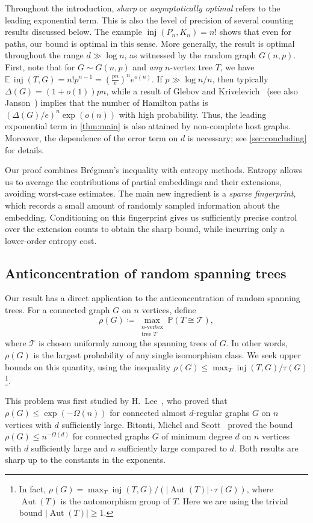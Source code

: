\documentclass[10pt,a4paper]{amsart}
\numberwithin{equation}{section}
\theoremstyle{definition}
\theoremstyle{remark}
\DeclareMathOperator{\Aut}{Aut}
\DeclareMathOperator{\inj}{inj}
\renewcommand{\Pr}{\mathbb P}
\begin{document}
Throughout the introduction, \emph{sharp} or \emph{asymptotically optimal} refers to the leading exponential term. This is also the level of precision of several counting results discussed below. The example $\inj(P_n,K_n)=n!$ shows that even for paths, our bound is optimal in this sense. More generally, the result is optimal throughout the range $d\gg \log n$, as witnessed by the random graph $G(n,p)$. First, note that for $G\sim G(n,p)$ and \textit{any} $n$-vertex tree $T$, we have $\mathbb E\,\inj(T,G)=n!p^{n-1} =\left(\frac{pn}{e}\right)^n e^{o(n)}.$
If $p\gg \log n/n$, then typically $\Delta(G)=(1+o(1))pn$, while a result of Glebov and Krivelevich~\cite{glebov2013hamilton} (see also Janson~\cite{janson1994numbers}) implies that the number of Hamilton paths is $(\Delta(G)/e)^n\exp(o(n))$ with high probability.
Thus, the leading exponential term in \cref{thm:main} is also attained by non-complete host graphs.
Moreover, the dependence of the error term on $d$ is necessary; see \cref{sec:concluding} for details.

Our proof combines Brégman's inequality with entropy methods. Entropy allows us to average the contributions of partial embeddings and their extensions, avoiding worst-case estimates. The main new ingredient is a \emph{sparse fingerprint}, which records a small amount of randomly sampled information about the embedding. Conditioning on this fingerprint gives us sufficiently precise control over the extension counts to obtain the sharp bound, while incurring only a lower-order entropy cost. 

\subsection{Anticoncentration of random spanning trees}
Our result has a direct application to the anticoncentration of random spanning trees.
For a connected graph $G$ on $n$ vertices, define
\[
    \rho(G) \coloneqq \max_{\substack{n\text{-vertex}\\ \text{tree } T}} \Pr(T\cong \mathcal T),
\]
where $\mathcal T$ is chosen uniformly among the spanning trees of $G$. In other words, $\rho(G)$ is the largest probability of any single isomorphism class. We seek upper bounds on this quantity, using the inequality $\rho(G) \leq \max_T \inj(T,G)/\tau(G)$\footnote{In fact, $\rho(G)= \max_T \inj(T,G)/(|\Aut(T)|\cdot \tau(G))$, where $\Aut(T)$ is the automorphism group of $T$. Here we are using the trivial bound $|\Aut(T)|\geq 1$.}.

This problem was first studied by H.~Lee~\cite{Lee}, who proved that $\rho(G)\leq \exp(-\Omega(n))$ for connected almost $d$-regular graphs $G$ on $n$ vertices with $d$ sufficiently large. Bitonti, Michel and Scott~\cite{BitontiMichelScott} proved the bound $\rho(G)\leq n^{-\Omega(d)}$ for connected graphs $G$ of minimum degree $d$ on $n$ vertices with $d$ sufficiently large and $n$ sufficiently large compared to $d$. Both results are sharp up to the constants in the exponents.
\end{document}
